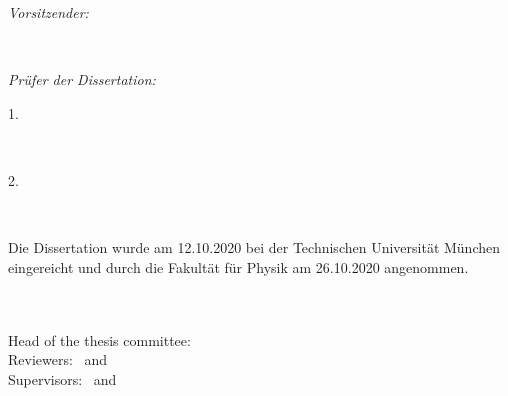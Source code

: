 \begin{titlepage}
	\vfill
	\begin{minipage}[t]{.27\textwidth}
		\raggedleft
		\textit{Vorsitzender:}
	\end{minipage}
	\hspace*{15pt}
	\begin{minipage}[t]{.65\textwidth}
		{\Large \thesisCommitteeChair}
	\end{minipage} \\[10mm]
	\begin{minipage}[t]{.27\textwidth}
		\raggedleft
		\textit{Prüfer der Dissertation:}
	\end{minipage}
	\hspace*{15pt}
	\begin{minipage}[t]{.65\textwidth}
		{\Large 1. \thesisFirstReviewer}
	\end{minipage} \\[5mm]
	\begin{minipage}[t]{.27\textwidth}
		\raggedleft
		\hfill
	\end{minipage}
	\hspace*{15pt}
	\begin{minipage}[t]{.65\textwidth}
		{\Large 2. \thesisSecondReviewer}
	\end{minipage} \\[10mm]
	\vfill

	{Die Dissertation wurde am 12.10.2020 bei der Technischen Universität München eingereicht und durch die Fakultät für Physik am 26.10.2020 angenommen.} \\

\end{titlepage}


\hfill
\vfill
{
	\small
	\textbf{\thesisName} \\
	\textit{\thesisTitle} \\
	Head of the thesis committee: \thesisCommitteeChair \\
	Reviewers: \thesisFirstReviewer\ and \thesisSecondReviewer \\
	Supervisors: \thesisFirstSupervisor\ and \thesisSecondSupervisor \\[1.5em]
	\textbf{\thesisUniversity}                         \hfill \textbf{\thesisInstitute}     \\
	\thesisUniversityDepartment                        \hfill \thesisInstituteSubtitle      \\
	\thesisUniversityStreetAddress                     \hfill \thesisInstituteStreetAddress \\
	\thesisUniversityPostalCode\ \thesisUniversityCity \hfill \thesisInstitutePostalCode\ \thesisInstituteCity \\
}
